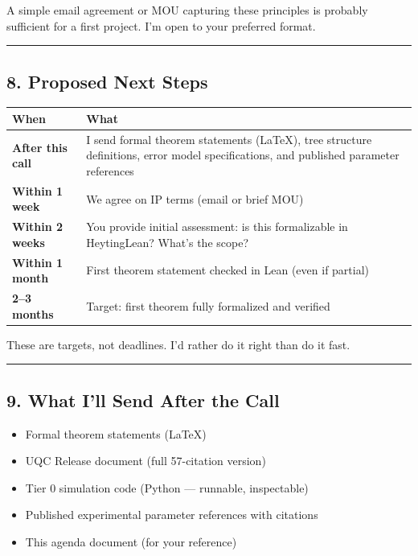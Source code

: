 \documentclass[11pt,a4paper]{article}
\begin{document}
A simple email agreement or MOU capturing these principles is probably sufficient for a first project. I'm open to your preferred format.

\bigskip
\noindent\rule{\textwidth}{0.4pt}
\bigskip
\subsection*{8. Proposed Next Steps}

\begin{center}
\begin{longtable}{|l|l|}
\hline
\textbf{When} & \textbf{What} \\ \hline
\endhead
\textbf{After this call} & I send formal theorem statements (\LaTeX), tree structure definitions, error model specifications, and published parameter references \\ \hline
\textbf{Within 1 week} & We agree on IP terms (email or brief MOU) \\ \hline
\textbf{Within 2 weeks} & You provide initial assessment: is this formalizable in HeytingLean? What's the scope? \\ \hline
\textbf{Within 1 month} & First theorem statement checked in Lean (even if partial) \\ \hline
\textbf{2–3 months} & Target: first theorem fully formalized and verified \\ \hline
\end{longtable}
\end{center}

These are targets, not deadlines. I'd rather do it right than do it fast.

\bigskip
\noindent\rule{\textwidth}{0.4pt}
\bigskip
\subsection*{9. What I'll Send After the Call}

\begin{itemize}[nosep]
\item Formal theorem statements (\LaTeX)
\item UQC Release document (full 57-citation version)
\item Tier 0 simulation code (Python — runnable, inspectable)
\item Published experimental parameter references with citations
\item This agenda document (for your reference)
\end{itemize}
\end{document}
